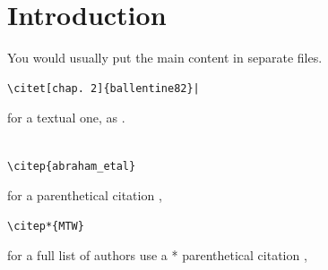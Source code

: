 \documentclass[11pt,a4paper]{report}      %
\begin{document}



\chapter{Introduction}
You would usually put the main content in separate files.
% 


\begin{verbatim}\citet[chap. 2]{ballentine82}|
\end{verbatim}
for a textual one, as \citet[chap. 2]{ballentine82}.\\
 \\
\begin{verbatim}\citep{abraham_etal}
 \end{verbatim}
 for a parenthetical citation \citep{abraham_etal},\\

 \begin{verbatim}\citep*{MTW}
 \end{verbatim}
 for a full list of authors use a * parenthetical citation \citep*{MTW},\\
 \\
\end{document}
